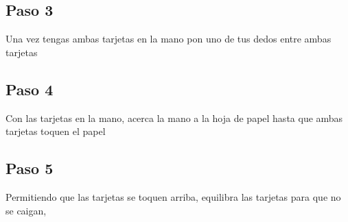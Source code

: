 \documentclass{article}
\begin{document}
\subsection{Paso 3}
Una vez tengas ambas tarjetas en la mano pon uno de tus dedos entre ambas tarjetas

\subsection{Paso 4}
Con las tarjetas en la mano, acerca la mano a la hoja de papel hasta que ambas tarjetas toquen el papel

\subsection{Paso 5}
Permitiendo que las tarjetas se toquen arriba, equilibra las tarjetas para que no se caigan, 
\end{document}

